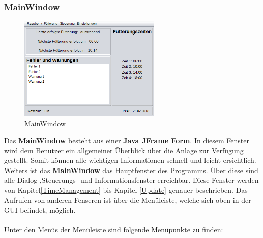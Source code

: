 \subsubsection{MainWindow}\label{subsubsec:MainWindow}
\begin{figure}
\vspace{-20pt}
  \begin{center}
    \includegraphics[width=0.60\textwidth]{Bilder/GUI/MainWindow}
  \end{center}
  \caption{MainWindow}
  \label{MainWindow}
  \vspace{-10pt}
\end{figure}
Das \textbf{MainWindow} besteht aus einer \textbf{Java JFrame Form}. In diesem Fenster wird dem Benutzer ein allgemeiner Überblick über die Anlage zur Verfügung gestellt. Somit können alle wichtigen Informationen schnell und leicht ersichtlich. Weiters ist das \textbf{MainWindow} das Hauptfenster des Programms. Über diese sind alle Dialog-,Steuerungs- und Informationsfenster erreichbar. Diese Fenster werden von Kapitel\ref{TimeManagement} bis Kapitel \ref{Update} genauer beschrieben. Das Aufrufen von anderen Fenseren ist über die Menüleiste, welche sich oben in der GUI befindet, möglich. 
\\ \\ Unter den Menüs der Menüleiste sind folgende Menüpunkte zu finden:
